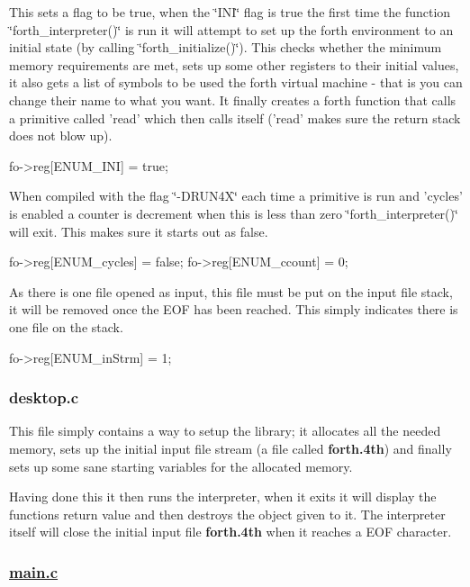 This sets a flag to be true, when the \char`\"{}\-I\-N\-I\char`\"{} flag is true the first time the function \char`\"{}forth\-\_\-interpreter()\char`\"{} is run it will attempt to set up the forth environment to an initial state (by calling \char`\"{}forth\-\_\-initialize()\char`\"{}). This checks whether the minimum memory requirements are met, sets up some other registers to their initial values, it also gets a list of symbols to be used the forth virtual machine -\/ that is you can change their name to what you want. It finally creates a forth function that calls a primitive called 'read' which then calls itself ('read' makes sure the return stack does not blow up). \begin{DoxyVerb}fo->reg[ENUM_INI] = true;
\end{DoxyVerb}


When compiled with the flag \char`\"{}-\/\-D\-R\-U\-N4\-X\char`\"{} each time a primitive is run and 'cycles' is enabled a counter is decrement when this is less than zero \char`\"{}forth\-\_\-interpreter()\char`\"{} will exit. This makes sure it starts out as false. \begin{DoxyVerb}fo->reg[ENUM_cycles] = false; 
fo->reg[ENUM_ccount] = 0; 
\end{DoxyVerb}


As there is one file opened as input, this file must be put on the input file stack, it will be removed once the E\-O\-F has been reached. This simply indicates there is one file on the stack. \begin{DoxyVerb}fo->reg[ENUM_inStrm] = 1;
\end{DoxyVerb}


\subsubsection*{desktop.\-c}

This file simply contains a way to setup the library; it allocates all the needed memory, sets up the initial input file stream (a file called {\bfseries forth.\-4th}) and finally sets up some sane starting variables for the allocated memory.

Having done this it then runs the interpreter, when it exits it will display the functions return value and then destroys the object given to it. The interpreter itself will close the initial input file {\bfseries forth.\-4th} when it reaches a E\-O\-F character.

\subsubsection*{\hyperlink{main_8c}{main.\-c}}

